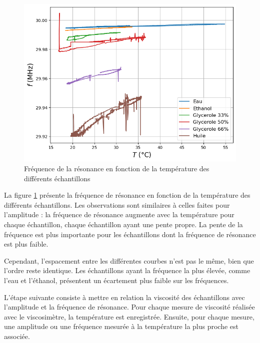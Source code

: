 \begin{figure}[H]
    \centering
    \includegraphics[width=\textwidth]{assets/figures/Frequ-Temperature.png}
    \caption{Fréquence de la résonance en fonction de la température des différents échantillons}
    \label{fig:Frequence VS Température}
\end{figure}

La figure \ref{fig:Frequence VS Température} présente la fréquence de résonance en fonction de la température des différents échantillons.  
Les observations sont similaires à celles faites pour l'amplitude : la fréquence de résonance augmente avec la température pour chaque échantillon, chaque échantillon ayant une pente propre.  
La pente de la fréquence est plus importante pour les échantillons dont la fréquence de résonance est plus faible.

Cependant, l'espacement entre les différentes courbes n'est pas le même, bien que l'ordre reste identique.  
Les échantillons ayant la fréquence la plus élevée, comme l'eau et l'éthanol, présentent un écartement plus faible sur les fréquences.

L’étape suivante consiste à mettre en relation la viscosité des échantillons avec l’amplitude et la fréquence de résonance.  
Pour chaque mesure de viscosité réalisée avec le viscosimètre, la température est enregistrée. Ensuite, pour chaque mesure, une amplitude ou une fréquence mesurée à la température la plus proche est associée.

